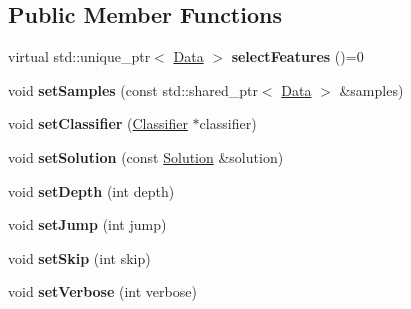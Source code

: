 \subsection*{Public Member Functions}
\begin{DoxyCompactItemize}
\item 
\mbox{\label{class_feature_selection_a499de83d5ceb877eece3909f0ad07ae8}} 
virtual std\+::unique\+\_\+ptr$<$ \hyperlink{class_data}{Data} $>$ {\bfseries select\+Features} ()=0
\item 
\mbox{\label{class_feature_selection_a2b18d898d233086bbb947df97745f102}} 
void {\bfseries set\+Samples} (const std\+::shared\+\_\+ptr$<$ \hyperlink{class_data}{Data} $>$ \&samples)
\item 
\mbox{\label{class_feature_selection_a4cbecbda1e052cd195bd398f4b28443b}} 
void {\bfseries set\+Classifier} (\hyperlink{class_classifier}{Classifier} $\ast$classifier)
\item 
\mbox{\label{class_feature_selection_a4857ba1521a7dd5028bfce8ad5dc6ebb}} 
void {\bfseries set\+Solution} (const \hyperlink{class_solution}{Solution} \&solution)
\item 
\mbox{\label{class_feature_selection_ad078d9693bee54329fd726c7806179b6}} 
void {\bfseries set\+Depth} (int depth)
\item 
\mbox{\label{class_feature_selection_a5863e5062b8bd88747f076e87731a26d}} 
void {\bfseries set\+Jump} (int jump)
\item 
\mbox{\label{class_feature_selection_a3cb485bf5b4c578a2dec6b35c56298a4}} 
void {\bfseries set\+Skip} (int skip)
\item 
\mbox{\label{class_feature_selection_ae05a8cc9e39df71f62a3f3ad42a756e2}} 
void {\bfseries set\+Verbose} (int verbose)
\end{DoxyCompactItemize}
